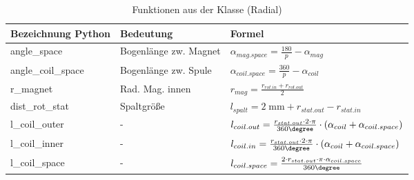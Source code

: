 \begin{table}[h!]

\centering
\caption{Funktionen aus der Klasse (Radial)}
\renewcommand{\arraystretch}{2}
\setlength{\tabcolsep}{5mm}

\begin{tabular}{lll}
    \toprule
     Bezeichnung Python & Bedeutung& Formel\\
    \midrule
	angle\_space &Bogenlänge zw. Magnet&$\alpha_ {mag.space} = \frac{180}{p} - \alpha_{mag}$\\
	angle\_coil\_space &Bogenlänge zw. Spule&$\alpha_{coil.space} = \frac{360}{p} -  \alpha_{coil}$\\
	r\_magnet &Rad. Mag. innen&$r_{mag} = \frac{r_{rot.in} + r_{rot.out}}{2}$\\
  dist\_rot\_stat &Spaltgröße&$l_{spalt}= 2\; \text{mm} + r_{stat.out} - r_{stat.in}$\\
  l\_coil\_outer &-&$l_{coil.out}=\frac{r_{stat.out} \cdot 2 \cdot \pi }{360 \degree} \cdot (\alpha_{coil} + \alpha_{coil.space})$\\
  l\_coil\_inner &-&$l_{coil.in}=\frac{r_{stat.out} \cdot 2 \cdot \pi }{360 \degree} \cdot (\alpha_{coil} + \alpha_{coil.space})$\\
  l\_coil\_space &-&$l_{coil.space}= \frac{2 \cdot r_{stat.out} \cdot \pi \cdot \alpha_{coil.space}}{360 \degree}$\\
 
	

    \bottomrule
  \end{tabular}
\end{table}

\newpage


